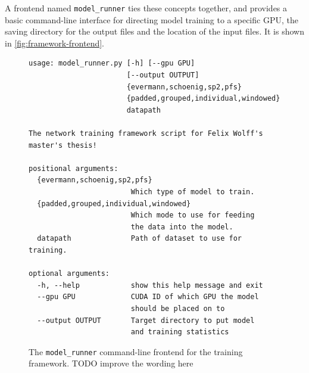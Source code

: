 A frontend named \verb=model_runner= ties these concepts together, and provides a basic command-line interface for directing model training to a specific GPU, the saving directory for the output files and the location of the input files. It is shown in \autoref{fig:framework-frontend}.
\begin{figure}
\centering
\begin{verbatim}
usage: model_runner.py [-h] [--gpu GPU]
                       [--output OUTPUT]
                       {evermann,schoenig,sp2,pfs}
                       {padded,grouped,individual,windowed}
                       datapath

The network training framework script for Felix Wolff's master's thesis!

positional arguments:
  {evermann,schoenig,sp2,pfs}
                        Which type of model to train.
  {padded,grouped,individual,windowed}
                        Which mode to use for feeding
                        the data into the model.
  datapath              Path of dataset to use for training.

optional arguments:
  -h, --help            show this help message and exit
  --gpu GPU             CUDA ID of which GPU the model
                        should be placed on to
  --output OUTPUT       Target directory to put model
                        and training statistics
\end{verbatim}
\caption{The \texttt{model\_runner} command-line frontend for the training framework. TODO improve the wording here}
\label{fig:framework-frontend}
\end{figure}